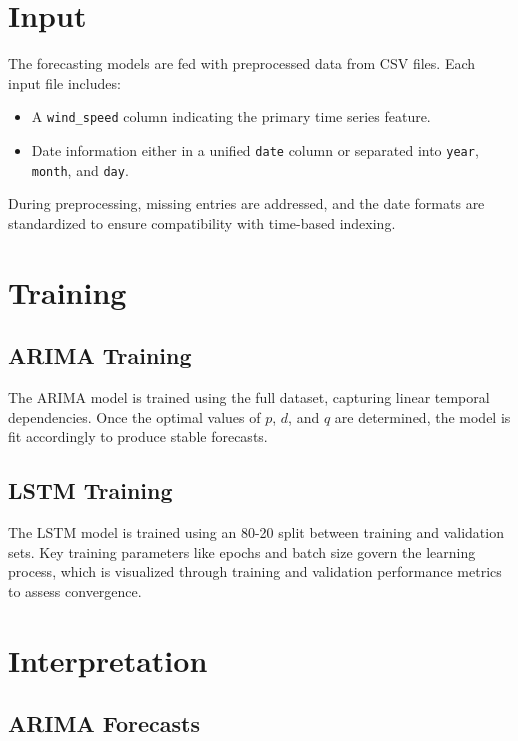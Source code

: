 \section{Input}

The forecasting models are fed with preprocessed data from CSV files. Each input file includes:

\begin{itemize}
	\item A \texttt{wind\_speed} column indicating the primary time series feature.
	\item Date information either in a unified \texttt{date} column or separated into \texttt{year}, \texttt{month}, and \texttt{day}.
\end{itemize}

During preprocessing, missing entries are addressed, and the date formats are standardized to ensure compatibility with time-based indexing.

\section{Training}

\subsection{ARIMA Training}

The ARIMA model is trained using the full dataset, capturing linear temporal dependencies. Once the optimal values of \(p\), \(d\), and \(q\) are determined, the model is fit accordingly to produce stable forecasts.

\subsection{LSTM Training}

The LSTM model is trained using an 80-20 split between training and validation sets. Key training parameters like epochs and batch size govern the learning process, which is visualized through training and validation performance metrics to assess convergence.

\section{Interpretation}

\subsection{ARIMA Forecasts}

